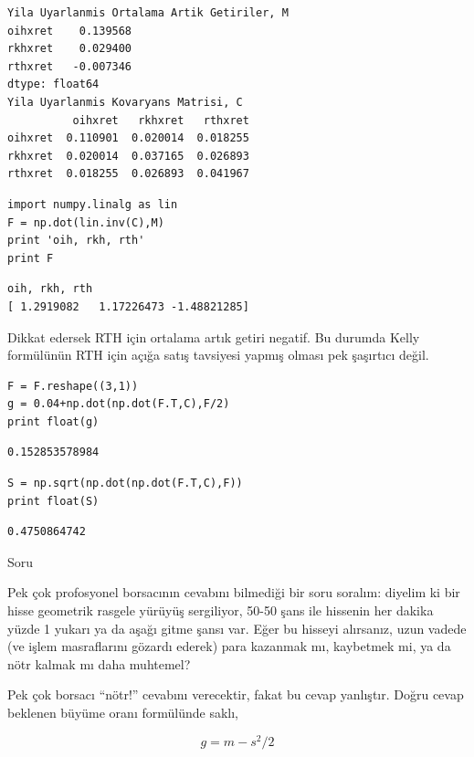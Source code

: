 \documentclass[12pt,fleqn]{article}\usepackage{../../common}
\begin{document}
\begin{verbatim}
Yila Uyarlanmis Ortalama Artik Getiriler, M
oihxret    0.139568
rkhxret    0.029400
rthxret   -0.007346
dtype: float64
Yila Uyarlanmis Kovaryans Matrisi, C
          oihxret   rkhxret   rthxret
oihxret  0.110901  0.020014  0.018255
rkhxret  0.020014  0.037165  0.026893
rthxret  0.018255  0.026893  0.041967
\end{verbatim}

\begin{verbatim}
import numpy.linalg as lin
F = np.dot(lin.inv(C),M)
print 'oih, rkh, rth'
print F
\end{verbatim}

\begin{verbatim}
oih, rkh, rth
[ 1.2919082   1.17226473 -1.48821285]
\end{verbatim}

Dikkat edersek RTH için ortalama artık getiri negatif. Bu durumda Kelly
formülünün RTH için açığa satış tavsiyesi yapmış olması pek şaşırtıcı
değil.

\begin{verbatim}
F = F.reshape((3,1))
g = 0.04+np.dot(np.dot(F.T,C),F/2)
print float(g)
\end{verbatim}

\begin{verbatim}
0.152853578984
\end{verbatim}

\begin{verbatim}
S = np.sqrt(np.dot(np.dot(F.T,C),F))
print float(S)
\end{verbatim}

\begin{verbatim}
0.4750864742
\end{verbatim}

Soru

Pek çok profosyonel borsacının cevabını bilmediği bir soru soralım: diyelim
ki bir hisse geometrik rasgele yürüyüş sergiliyor, 50-50 şans ile hissenin
her dakika yüzde 1 yukarı ya da aşağı gitme şansı var. Eğer bu hisseyi
alırsanız, uzun vadede (ve işlem masraflarını gözardı ederek) para kazanmak
mı, kaybetmek mi, ya da nötr kalmak mı daha muhtemel?

Pek çok borsacı ``nötr!'' cevabını verecektir, fakat bu cevap
yanlıştır. Doğru cevap beklenen büyüme oranı formülünde saklı, 

$$ g = m - s^2/2 $$
\end{document}

